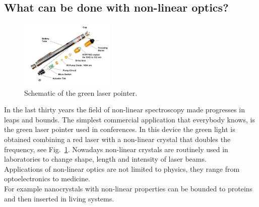\subsection{What can be done with non-linear optics?} 
\begin{figure}
  \begin{center}
    \includegraphics[width=0.4\textwidth]{Figures/lasergreen}
  \end{center}
  \caption{Schematic of the green laser pointer. \label{greenlaser}}
\end{figure}
In the last thirty years the field of non-linear spectroscopy\cite{bloembergen1982nonlinear} made progresses in leaps and bounds. The simplest commercial application that everybody knows, is the green laser pointer used in conferences. In this device the green light is obtained combining a red laser with a non-linear crystal that doubles the frequency, see Fig.~\ref{greenlaser}. Nowadays non-linear crystals are routinely used in laboratories to change shape, length and intensity of laser beams. \\
        Applications of non-linear optics are not limited to physics, they range from optoelectronics to medicine. \\
        For example nanocrystals with non-linear properties can be bounded to proteins and then inserted in living systems.


